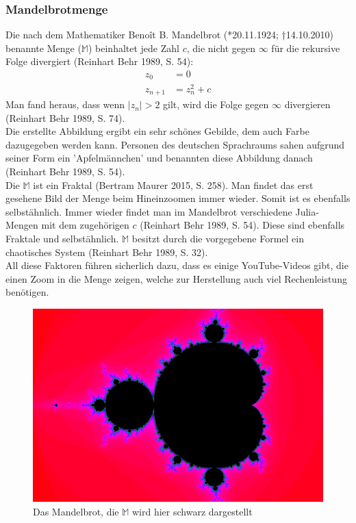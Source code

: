 \subsubsection{Mandelbrotmenge}
Die nach dem Mathematiker Benoît B. Mandelbrot (*20.11.1924; †14.10.2010) benannte Menge ($\mathbb{M}$) beinhaltet jede Zahl $c$, die nicht gegen $\infty$ für die rekursive Folge divergiert (Reinhart Behr 1989, S. 54):
\begin{align*}
z_0&=0\\
z_{n+1}&=z^2_n+c
\end{align*}
Man fand heraus, dass wenn $|z_n| > 2$ gilt, wird die Folge gegen $\infty$ divergieren (Reinhart Behr 1989, S. 74).\\
Die erstellte Abbildung ergibt ein sehr schönes Gebilde, dem auch Farbe dazugegeben werden kann. Personen des deutschen Sprachraums sahen aufgrund seiner Form ein ’Apfelmännchen’ und benannten diese Abbildung danach (Reinhart Behr 1989, S. 54).\\
Die $\mathbb{M}$ ist ein Fraktal (Bertram Maurer 2015, S. 258). Man findet das erst gesehene Bild der Menge beim Hineinzoomen immer wieder. Somit ist es ebenfalls selbstähnlich. Immer wieder findet man im Mandelbrot verschiedene Julia-Mengen mit dem zugehörigen $c$ (Reinhart Behr 1989, S. 54). Diese sind ebenfalls Fraktale und selbstähnlich. $\mathbb{M}$ besitzt durch die vorgegebene Formel ein chaotisches System (Reinhart Behr 1989, S. 32).\\
All diese Faktoren führen sicherlich dazu, dass es einige YouTube-Videos gibt, die einen Zoom in die Menge zeigen, welche zur Herstellung auch viel Rechenleistung benötigen.
\begin{figure}[h]
	\centering
	\includegraphics[width=.5\textwidth]{Pictures/Mandelbrot2668x4002.png}
	\caption[Mandelbrot (eigenes Bild)]{Das Mandelbrot, die $\mathbb{M}$ wird hier schwarz dargestellt}
	\label{fig:Mandelbrot}
\end{figure}
\newpage
